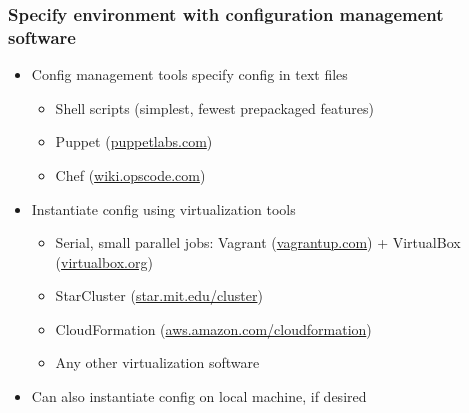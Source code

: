 \documentclass [14pt]{beamer}
\begin{document}
\begin{frame}
\frametitle{Specify environment with configuration management software}
\begin{itemize}
\item Config management tools specify config in text
  files
\begin{itemize}
\item Shell scripts (simplest, fewest prepackaged features)
\item Puppet (\url{puppetlabs.com})
\item Chef (\url{wiki.opscode.com})
\end{itemize}
\item Instantiate config using virtualization tools
\begin{itemize}
\item Serial, small parallel jobs: Vagrant (\url{vagrantup.com}) + VirtualBox
  (\url{virtualbox.org})
\item StarCluster (\url{star.mit.edu/cluster})
\item CloudFormation (\url{aws.amazon.com/cloudformation})
\item Any other virtualization software
\end{itemize}
\item Can also instantiate config on local machine, if desired
\end{itemize}
\end{frame}


\end{document}
